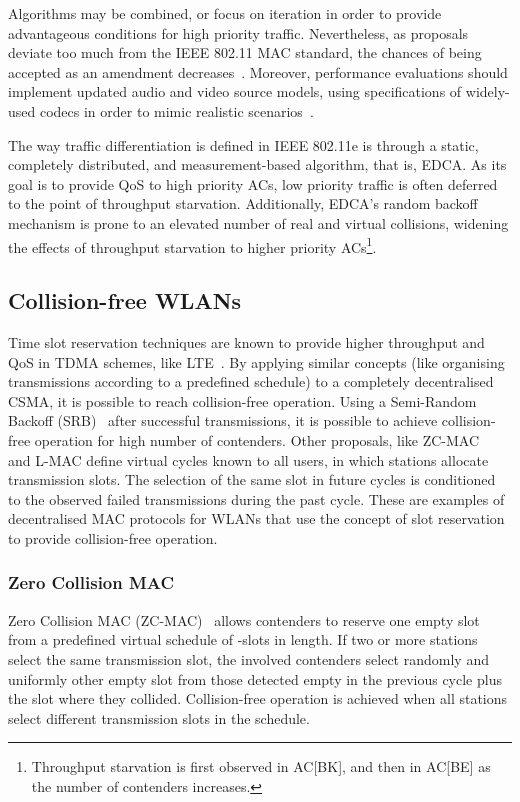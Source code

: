 \documentclass[a4paper]{article}
\begin{document}
Algorithms may be combined, or focus on iteration in order to provide advantageous conditions for high priority traffic. Nevertheless, as proposals deviate too much from the IEEE 802.11 MAC standard, the chances of being accepted as an amendment decreases~\cite{WMP,perahia2008ieee}. Moreover, performance evaluations should implement updated audio and video source models, using specifications of widely-used codecs in order to mimic realistic scenarios~\cite{van2008traffic,menth2009source}.

The way traffic differentiation is defined in IEEE 802.11e is through a static, completely distributed, and measurement-based algorithm, that is, EDCA. As its goal is to provide QoS to high priority ACs, low priority traffic is often deferred to the point of throughput starvation. Additionally, EDCA's random backoff mechanism is prone to an elevated number of real and virtual collisions, widening the effects of throughput starvation to higher priority ACs\footnote{Throughput starvation is first observed in AC[BK], and then in AC[BE] as the number of contenders increases.}. 

\subsection{Collision-free WLANs}
Time slot reservation techniques are known to provide higher throughput and QoS in TDMA schemes, like LTE~\cite{canoLTEcoexistence}. By applying similar concepts (like organising transmissions according to a predefined schedule) to a completely decentralised CSMA, it is possible to reach collision-free operation. Using a Semi-Random Backoff (SRB)~\cite{HE} after successful transmissions, it is possible to achieve collision-free operation for high number of contenders. Other proposals, like ZC-MAC~\cite{ZMAC} and L-MAC\cite{L_MAC} define virtual cycles known to all users, in which stations allocate transmission slots. The selection of the same slot in future cycles is conditioned to the observed failed transmissions during the past cycle. These are examples of decentralised MAC protocols for WLANs that use the concept of slot reservation to provide collision-free operation.

\subsubsection{Zero Collision MAC}
Zero Collision MAC (ZC-MAC)~\cite{ZMAC} allows contenders to reserve one empty slot from a predefined virtual schedule of -slots in length. If two or more stations select the same transmission slot, the involved contenders select randomly and uniformly other empty slot from those detected empty in the previous cycle plus the slot where they collided. Collision-free operation is achieved when all  stations select different transmission slots in the schedule.
\end{document}
